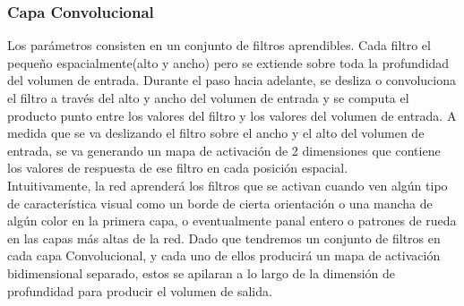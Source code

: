 \documentclass[a4paper,11pt,spanish]{book}
\begin{document}
      \subsubsection{Capa Convolucional}
	Los parámetros consisten en un conjunto de filtros aprendibles. Cada filtro el pequeño espacialmente(alto y ancho) pero se extiende sobre toda la profundidad del volumen de entrada.
	Durante el paso hacia adelante, se desliza o convoluciona el filtro a través del alto y ancho del volumen de entrada y se computa el producto punto entre los valores del filtro y los valores
	del volumen de entrada. A medida que se va deslizando el filtro sobre el ancho y el alto del volumen de entrada, se va generando un mapa de activación de 2 dimensiones que contiene los
	valores de respuesta de ese filtro en cada posición espacial.\\
	Intuitivamente, la red aprenderá los filtros que se activan cuando ven algún tipo de característica visual como un borde de cierta orientación o una mancha de algún color en la
	primera capa, o eventualmente panal entero o patrones de rueda en las capas más altas de la red. Dado que tendremos un conjunto de filtros en cada capa Convolucional,
	y cada uno de ellos producirá un mapa de activación bidimensional separado, estos se apilaran a lo largo de la dimensión de profundidad para producir el volumen de salida.\\
\end{document}
